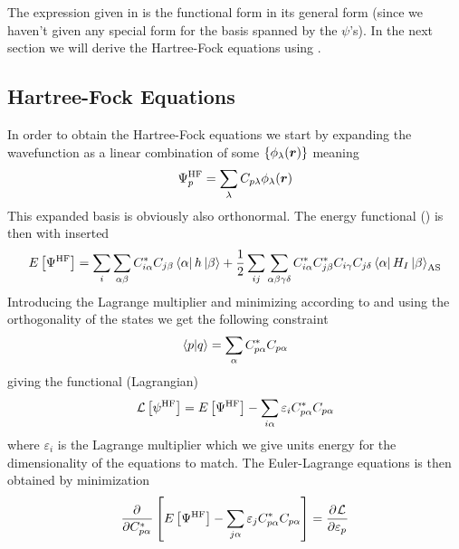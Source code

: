         The expression given in  is the functional form in
        its general form (since we haven't given any special form for the basis
        spanned by the $\psi$'s). In the next section we will derive the
        Hartree-Fock equations using .

    \subsection{Hartree-Fock Equations}
        In order to obtain the Hartree-Fock equations we start by expanding the
        wavefunction as a linear combination of some  $\{\phi_{\lambda}(\boldsymbol{{r}})\}$ meaning
            \begin{equation}
                \Psi^{\text{HF}}_p = \sum_{\lambda}
                C_{p\lambda}\phi_{\lambda}(\boldsymbol{{r}})
                \label{eq:psiexpand}
            \end{equation}
        This expanded basis is obviously also orthonormal. The energy
        functional () is then with 
        inserted
            \begin{equation}
                E\left[\Psi^{\text{HF}}\right] = \sum_i\sum_{\alpha\beta}
                C^*_{i\alpha}C_{j\beta}\bra{\alpha}h\ket{\beta} + \frac{1}{2}
                \sum_{ij} \sum_{\alpha\beta\gamma\delta}
                C^{*}_{i\alpha}C^{*}_{j\beta}C_{i\gamma}C_{j\delta}
                \bra{\alpha}H_{I}\ket{\beta}_{\text{AS}}
            \end{equation}
        Introducing the Lagrange multiplier and minimizing according to
         and using the orthogonality of the
        states we get the following constraint
            \begin{equation}
                \braket{p}{q} = \sum_{\alpha} C^{*}_{p\alpha}C_{p\alpha}
            \end{equation}
        giving the functional (Lagrangian)
            \begin{equation}
                \mathcal{L}\left[\psi^{\text{HF}}\right] = E\left[\Psi^{\text{HF}}\right] -
                \sum_{i\alpha} \varepsilon_iC^{*}_{p\alpha}C_{p\alpha}
            \end{equation}
        where $\varepsilon_i$ is the Lagrange multiplier which we give units
        energy for the dimensionality of the equations to match. The
        Euler-Lagrange equations is then obtained by minimization
            \begin{equation}
                \prd{C^{*}_{p\alpha}} \left[\EHF - \sum_{j\alpha}
                \varepsilon_jC^{*}_{p\alpha}C_{p\alpha}\right] =
                \prd{\varepsilon_p}[\mathcal{L}]
                \label{eq:EulerLagrange1}
            \end{equation}
